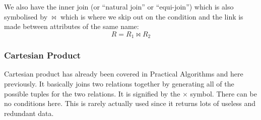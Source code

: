 We also have the inner join (or ``natural join'' or ``equi-join'') which is also symbolised by \(\bowtie\) which is where we skip out on the condition and the link is made between attributes of the same name:
\[
    R=R_1 \bowtie R_2
\]

\subsubsection{Cartesian Product}\label{ssub:cartesian_productdsrsixx}

Cartesian product has already been covered in Practical Algorithms and here previously. It basically joins two relations together by generating all of the possible tuples for the two relations.
It is signified by the \(\times\) symbol.
There can be no conditions here.
This is rarely actually used since it returns lots of useless and redundant data.
